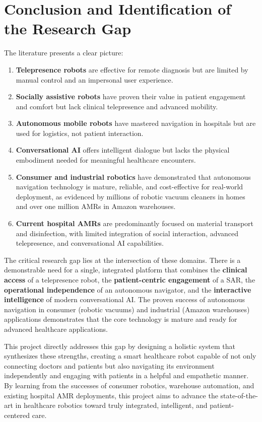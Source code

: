 \documentclass[11pt,a4paper]{article}
\begin{document}
\section{Conclusion and Identification of the Research Gap}

The literature presents a clear picture:
\begin{enumerate}
    \item \textbf{Telepresence robots} are effective for remote diagnosis but are limited by manual control and an impersonal user experience.
    \item \textbf{Socially assistive robots} have proven their value in patient engagement and comfort but lack clinical telepresence and advanced mobility.
    \item \textbf{Autonomous mobile robots} have mastered navigation in hospitals but are used for logistics, not patient interaction.
    \item \textbf{Conversational AI} offers intelligent dialogue but lacks the physical embodiment needed for meaningful healthcare encounters.
    \item \textbf{Consumer and industrial robotics} have demonstrated that autonomous navigation technology is mature, reliable, and cost-effective for real-world deployment, as evidenced by millions of robotic vacuum cleaners in homes and over one million AMRs in Amazon warehouses.
    \item \textbf{Current hospital AMRs} are predominantly focused on material transport and disinfection, with limited integration of social interaction, advanced telepresence, and conversational AI capabilities.
\end{enumerate}

The critical research gap lies at the intersection of these domains. There is a demonstrable need for a single, integrated platform that combines the \textbf{clinical access} of a telepresence robot, the \textbf{patient-centric engagement} of a SAR, the \textbf{operational independence} of an autonomous navigator, and the \textbf{interactive intelligence} of modern conversational AI. The proven success of autonomous navigation in consumer (robotic vacuums) and industrial (Amazon warehouses) applications demonstrates that the core technology is mature and ready for advanced healthcare applications.

This project directly addresses this gap by designing a holistic system that synthesizes these strengths, creating a smart healthcare robot capable of not only connecting doctors and patients but also navigating its environment independently and engaging with patients in a helpful and empathetic manner. By learning from the successes of consumer robotics, warehouse automation, and existing hospital AMR deployments, this project aims to advance the state-of-the-art in healthcare robotics toward truly integrated, intelligent, and patient-centered care.
\end{document}
